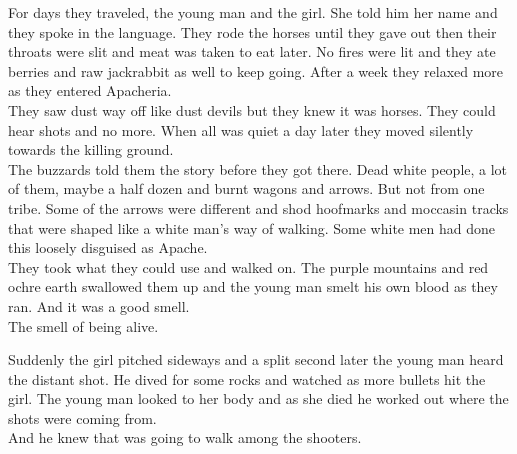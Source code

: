 



For days they traveled, the young man and the  girl. She told him her name and they spoke in the language. They rode the horses until they gave out then their throats were slit and meat was taken to eat later. No fires were lit and they ate berries and raw jackrabbit as well to keep going. After a week they relaxed more as they entered Apacheria. \\

They saw dust way off like dust devils but they knew it was horses. They could hear shots and no more. When all was quiet a day later they moved silently towards the killing ground. \\

The buzzards told them the story before they got there. Dead white people, a lot of them, maybe a half dozen and burnt wagons and arrows. But not from one tribe. Some of the arrows were different and shod hoofmarks and moccasin tracks that were shaped like a white man's way of walking. Some white men had done this loosely disguised as Apache. \\

They took what they could use and walked on. The purple mountains and red ochre earth swallowed them up and the young man smelt his own blood as they ran. And it was a good smell. \\

The smell of being alive. \\




Suddenly the girl pitched sideways and a split second later the young man heard the distant shot. He dived for some rocks and watched as more bullets hit the girl. The young man looked to her body and as she died he worked out where the shots were coming from. \\

And he knew that  was going to walk among the shooters. \\


